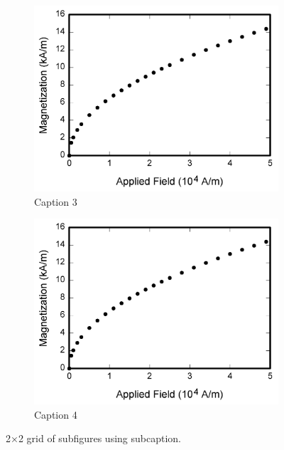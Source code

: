 \begin{figure}[htbp]
    \begin{subfigure}{0.45\columnwidth}
        \includegraphics[width=\linewidth]{Photos/fig1.png}
        \caption{Caption 3}
        \label{fig:2c}
    \end{subfigure}\hfill
    \begin{subfigure}{0.45\columnwidth}
        \includegraphics[width=\linewidth]{Photos/fig1.png}
        \caption{Caption 4}
        \label{fig:2d}
    \end{subfigure}

    \caption{2×2 grid of subfigures using subcaption.}
    \label{fig:grid_subcaption}
\end{figure}


